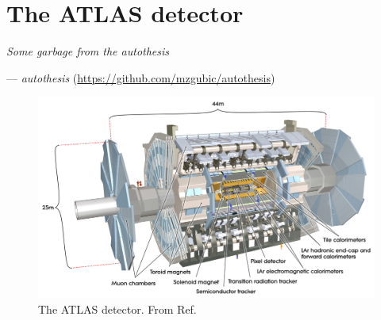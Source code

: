 \chapter{The ATLAS detector}

\textit{Some garbage from the autothesis}
\vspace{5mm}
\begin{flushright}
--- \textit{autothesis} (\url{https://github.com/mzgubic/autothesis})
\end{flushright}

\newpage

\begin{figure}[h]
  \centering
  \includegraphics[width=1\textwidth]{figures/experiment/atlas}
  \caption[The ATLAS detector.]{The ATLAS detector. From Ref. \cite{CERN:39038}}
   \label{fig:exp:atlas}
\end{figure}
